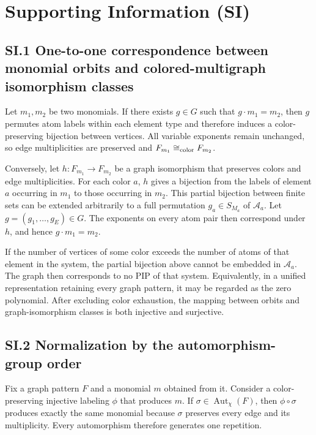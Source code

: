 \section{Supporting Information (SI)}\label{sec:supporting-information}

\subsection{SI.1 One-to-one correspondence between monomial orbits and colored-multigraph isomorphism classes}\label{sec:si-orbit-cmg}

Let \(m_1,m_2\) be two monomials. If there exists \(g\in G\) such that \(g\cdot m_1=m_2\), then \(g\) permutes atom labels within each element type and therefore induces a color-preserving bijection between vertices. All variable exponents remain unchanged, so edge multiplicities are preserved and \(F_{m_1}\cong_{\rm color}F_{m_2}\).

Conversely, let \(h:F_{m_1}\to F_{m_2}\) be a graph isomorphism that preserves colors and edge multiplicities. For each color \(a\), \(h\) gives a bijection from the labels of element \(a\) occurring in \(m_1\) to those occurring in \(m_2\). This partial bijection between finite sets can be extended arbitrarily to a full permutation \(g_a\in S_{M_a}\) of \(\mathcal A_a\). Let \(g=(g_1,\ldots,g_E)\in G\). The exponents on every atom pair then correspond under \(h\), and hence \(g\cdot m_1=m_2\).

If the number of vertices of some color exceeds the number of atoms of that element in the system, the partial bijection above cannot be embedded in \(\mathcal A_a\). The graph then corresponds to no PIP of that system. Equivalently, in a unified representation retaining every graph pattern, it may be regarded as the zero polynomial. After excluding color exhaustion, the mapping between orbits and graph-isomorphism classes is both injective and surjective.

\subsection{SI.2 Normalization by the automorphism-group order}\label{sec:si-automorphism}

Fix a graph pattern \(F\) and a monomial \(m\) obtained from it. Consider a color-preserving injective labeling \(\phi\) that produces \(m\). If \(\sigma\in\operatorname{Aut}_\chi(F)\), then \(\phi\circ\sigma\) produces exactly the same monomial because \(\sigma\) preserves every edge and its multiplicity. Every automorphism therefore generates one repetition.

